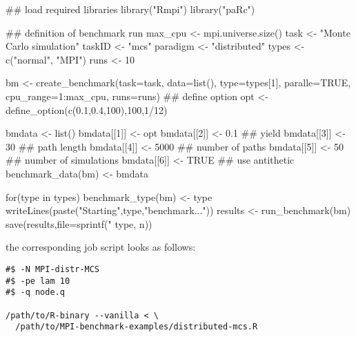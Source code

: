 \begin{Scode}
## load required libraries
library("Rmpi")
library("paRc")

## definition of benchmark run
max_cpu <- mpi.universe.size()
task <- "Monte Carlo simulation"
taskID <- "mcs"
paradigm <- "distributed"
types <- c("normal", "MPI")
runs <- 10

bm <- create_benchmark(task=task, data=list(),
                       type=types[1], paralle=TRUE,
                       cpu_range=1:max_cpu, runs=runs)
## define option
opt <- define_option(c(0.1,0.4,100),100,1/12)

bmdata <- list()
bmdata[[1]] <- opt
bmdata[[2]] <- 0.1 ## yield
bmdata[[3]] <- 30  ## path length
bmdata[[4]] <- 5000 ## number of paths
bmdata[[5]] <- 50  ## number of simulations
bmdata[[6]] <- TRUE ## use antithetic
benchmark_data(bm) <- bmdata

for(type in types){
  benchmark_type(bm) <- type
  writeLines(paste("Starting",type,"benchmark..."))
  results <- run_benchmark(bm)
  save(results,file=sprintf("%
                               type, n))
}

\end{Scode}
the corresponding job script looks as follows:

\begin{verbatim}
#$ -N MPI-distr-MCS
#$ -pe lam 10
#$ -q node.q

/path/to/R-binary --vanilla < \
  /path/to/MPI-benchmark-examples/distributed-mcs.R
\end{verbatim}
